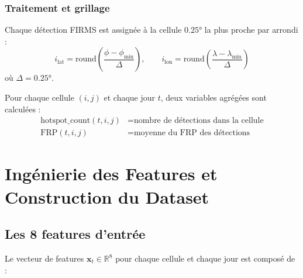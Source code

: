 \documentclass[12pt,a4paper]{report}
\begin{document}
\subsection{Traitement et grillage}

Chaque détection FIRMS est assignée à la cellule $0.25°$ la plus proche par arrondi :
\begin{equation}
  i_\text{lat} = \text{round}\!\left(\frac{\phi - \phi_\text{min}}{\Delta}\right), \qquad
  i_\text{lon} = \text{round}\!\left(\frac{\lambda - \lambda_\text{min}}{\Delta}\right)
\end{equation}
où $\Delta = 0.25°$.

Pour chaque cellule $(i, j)$ et chaque jour $t$, deux variables agrégées sont calculées :
\begin{align}
  \text{hotspot\_count}(t, i, j) &= \text{nombre de détections dans la cellule} \\
  \text{FRP}(t, i, j) &= \text{moyenne du FRP des détections}
\end{align}

\clearpage

\chapter{Ingénierie des Features et Construction du Dataset}
\label{chap:features}

\section{Les 8 features d'entrée}

Le vecteur de features $\mathbf{x}_t \in \mathbb{R}^8$ pour chaque cellule et chaque jour
est composé de :
\end{document}
